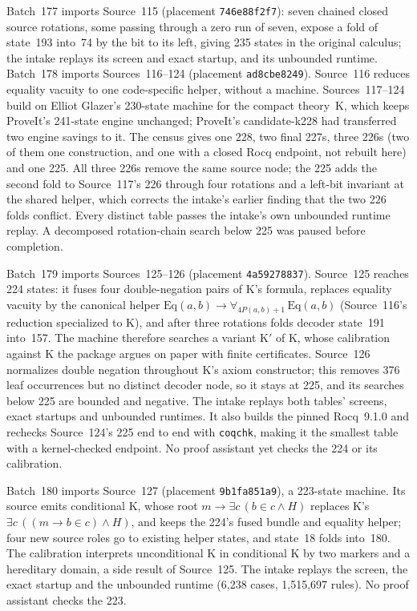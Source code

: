 \documentclass[11pt]{article}
\begin{document}
{Batch~177 imports Source~115 (placement \texttt{746e88f2f7}): seven chained closed
source rotations, some passing through a zero run of seven, expose a fold of state~193
into~74 by the bit to its left, giving 235 states in the original calculus; the intake
replays its screen and exact startup, and its unbounded runtime. Batch~178 imports
Sources~116--124 (placement \texttt{ad8cbe8249}). Source~116 reduces equality vacuity to
one code-specific helper, without a machine. Sources~117--124 build on Elliot Glazer's
230-state machine for the compact theory~K, which keeps ProveIt's 241-state engine
unchanged; ProveIt's candidate-k228 had transferred two engine savings to it. The census
gives one 228, two final 227s, three 226s (two of them one construction, and one with a
closed Rocq endpoint, not rebuilt here) and one 225. All three 226s remove the same source
node; the 225 adds the second fold to Source~117's 226 through four rotations and a
left-bit invariant at the shared helper, which corrects the intake's earlier finding that
the two 226 folds conflict. Every distinct table passes the intake's own unbounded
runtime replay. A decomposed rotation-chain search below 225 was paused before completion.

Batch~179 imports Sources~125--126 (placement \texttt{4a59278837}). Source~125 reaches
224 states: it fuses four double-negation pairs of K's formula, replaces equality
vacuity by the canonical helper $\mathrm{Eq}(a,b)\to\forall_{4P(a,b)+1}\,\mathrm{Eq}(a,b)$
(Source~116's reduction specialized to K), and after three rotations folds decoder
state~191 into~157. The machine therefore searches a variant K$'$ of K, whose
calibration against K the package argues on paper with finite certificates. Source~126
normalizes double negation throughout K's axiom constructor; this removes 376 leaf
occurrences but no distinct decoder node, so it stays at 225, and its searches below 225
are bounded and negative. The intake replays both tables' screens, exact startups and
unbounded runtimes. It also builds the pinned Rocq~9.1.0 and rechecks Source~124's 225
end to end with \texttt{coqchk}, making it the smallest table with a kernel-checked
endpoint. No proof assistant yet checks the 224 or its calibration.

Batch~180 imports Source~127 (placement \texttt{9b1fa851a9}), a 223-state machine. Its
source emits conditional K, whose root $m\to\exists c\,(b\in c\wedge H)$ replaces K's
$\exists c\,((m\to b\in c)\wedge H)$, and keeps the 224's fused bundle and equality helper;
four new source roles go to existing helper states, and state~18 folds into~180. The
calibration interprets unconditional K in conditional K by two markers and a hereditary
domain, a side result of Source~125. The intake replays the screen, the exact startup and
the unbounded runtime (6,238 cases, 1,515,697 rules). No proof assistant checks the 223.

}
\end{document}
